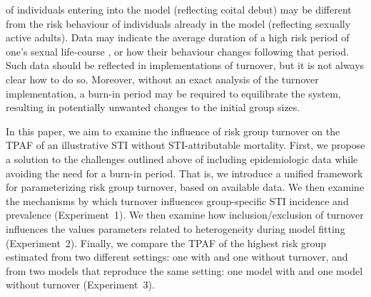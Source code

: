 of individuals entering into the model (reflecting coital debut)
may be different from the risk behaviour
of individuals already in the model (reflecting sexually active adults). %
Data may indicate the average duration
of a high risk period of one's sexual life-course \citep{Watts2010}, %
or how their behaviour changes following that period. %
Such data should be reflected in implementations of turnover,
but it is not always clear how to do so.
Moreover, without an exact analysis of the turnover implementation,
a burn-in period may be required to equilibrate the system,
resulting in potentially unwanted changes to the initial group sizes.
\par
In this paper, we aim to examine the influence of risk group turnover
on the TPAF of an illustrative STI without STI-attributable mortality.
First, we propose a solution to the challenges outlined above
of including epidemiologic data while avoiding the need for a burn-in period.
That is, we introduce a unified framework for
parameterizing risk group turnover, based on available data.
We then examine the mechanisms by which turnover
influences group-specific STI incidence and prevalence
(Experiment~1).
We then examine how inclusion/exclusion of turnover influences
the values parameters related to heterogeneity during model fitting
(Experiment~2).
Finally, we compare the TPAF of the highest risk group estimated
from two different settings: one with and one without turnover,
and from two models that reproduce the same setting:
one model with and one model without turnover
(Experiment~3).
